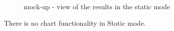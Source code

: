 \documentclass[a4paper,11pt]{report}
\begin{document}
\begin{figure}[H]
\begin{center}
\caption{mock-up - view of the results in the static mode}
\end{center}
\end{figure}
There is no chart functionality in Static mode.
\vspace*{\fill}
\newpage
\end{document}
